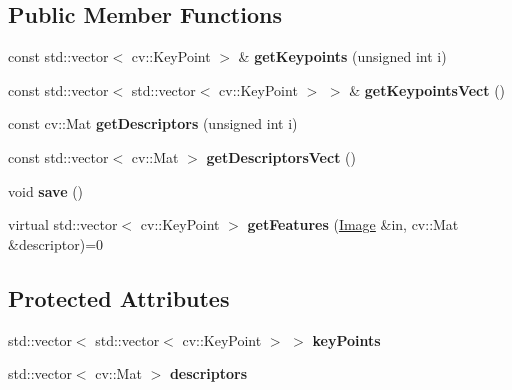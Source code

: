 \subsection*{Public Member Functions}
\begin{DoxyCompactItemize}
\item 
const std\+::vector$<$ cv\+::\+Key\+Point $>$ \& {\bfseries get\+Keypoints} (unsigned int i)\hypertarget{classFeatureExtractor_af1efab93c025c4fa7702d5f3030162ca}{}\label{classFeatureExtractor_af1efab93c025c4fa7702d5f3030162ca}

\item 
const std\+::vector$<$ std\+::vector$<$ cv\+::\+Key\+Point $>$ $>$ \& {\bfseries get\+Keypoints\+Vect} ()\hypertarget{classFeatureExtractor_a4d60e9785ebdd8f3cd9ec4376b42c76a}{}\label{classFeatureExtractor_a4d60e9785ebdd8f3cd9ec4376b42c76a}

\item 
const cv\+::\+Mat {\bfseries get\+Descriptors} (unsigned int i)\hypertarget{classFeatureExtractor_ad66314da10ac655a7aa0a84240358e0a}{}\label{classFeatureExtractor_ad66314da10ac655a7aa0a84240358e0a}

\item 
const std\+::vector$<$ cv\+::\+Mat $>$ {\bfseries get\+Descriptors\+Vect} ()\hypertarget{classFeatureExtractor_a5993cd368b58cba1e4d7e1ebfba8150a}{}\label{classFeatureExtractor_a5993cd368b58cba1e4d7e1ebfba8150a}

\item 
void {\bfseries save} ()\hypertarget{classFeatureExtractor_a77bddef3bcc6abb2a8931234caeb78d1}{}\label{classFeatureExtractor_a77bddef3bcc6abb2a8931234caeb78d1}

\item 
virtual std\+::vector$<$ cv\+::\+Key\+Point $>$ {\bfseries get\+Features} (\hyperlink{classImage}{Image} \&in, cv\+::\+Mat \&descriptor)=0\hypertarget{classFeatureExtractor_a948b80d2c80b27d7a75332adb47495b0}{}\label{classFeatureExtractor_a948b80d2c80b27d7a75332adb47495b0}

\end{DoxyCompactItemize}
\subsection*{Protected Attributes}
\begin{DoxyCompactItemize}
\item 
std\+::vector$<$ std\+::vector$<$ cv\+::\+Key\+Point $>$ $>$ {\bfseries key\+Points}\hypertarget{classFeatureExtractor_aa3af21a7f3fa538dce8f66242d9ad58a}{}\label{classFeatureExtractor_aa3af21a7f3fa538dce8f66242d9ad58a}

\item 
std\+::vector$<$ cv\+::\+Mat $>$ {\bfseries descriptors}\hypertarget{classFeatureExtractor_a084b6eef4805aae1bc01568ae8420029}{}\label{classFeatureExtractor_a084b6eef4805aae1bc01568ae8420029}

\end{DoxyCompactItemize}
